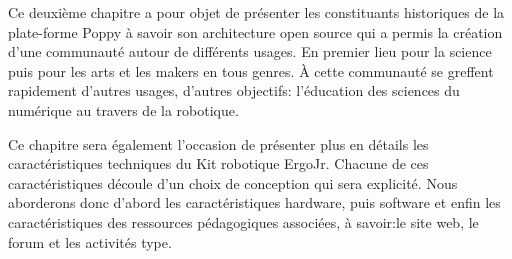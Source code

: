 \begin{resumChap}[.8]
Ce deuxième chapitre a pour objet de présenter les constituants historiques de la plate-forme Poppy à savoir son architecture open source  qui a permis la création d'une communauté autour de différents usages. En premier lieu pour la science puis pour les arts et les makers en tous genres. À cette communauté se greffent rapidement d'autres usages, d'autres objectifs: l'éducation des sciences du numérique au travers de la robotique.\par%
Ce chapitre sera également l'occasion de présenter plus en détails les caractéristiques techniques du Kit robotique ErgoJr. Chacune de ces caractéristiques découle d'un choix de conception qui sera explicité. Nous aborderons donc d'abord les caractéristiques hardware, puis software et enfin les caractéristiques des ressources pédagogiques associées, à savoir:le site web, le forum et les activités type.
\end{resumChap}
